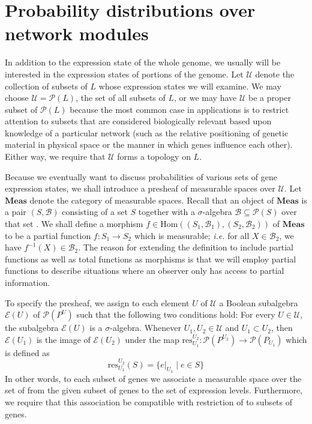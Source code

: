 \section{Probability distributions over network modules}

In addition to the expression state of the whole genome, we usually will be interested in the expression states of portions of the genome.  Let $\mathcal{U}$ denote the collection of subsets of $L$ whose expression states we will examine.  We may choose $\mathcal{U} = \mathcal{P}(L)$, the set of all subsets of $L$, or we may have $\mathcal{U}$ be a proper subset of $\mathcal{P}(L)$ because the most common case in applications is to restrict attention to subsets that are considered biologically relevant based upon knowledge of a particular network (such as the relative positioning of genetic material in physical space or the manner in which genes influence each other).  Either way, we require that $\mathcal{U}$ forms a topology on $L$.

Because we eventually want to discuss probabilities of various sets of gene expression states, we shall introduce a presheaf of measurable spaces over $\mathcal{U}$.  Let $\mathbf{Meas}$ denote the category of measurable spaces. Recall that an object of $\mathbf{Meas}$ is a pair $(S,\mathcal{B})$ consisting of a set $S$ together with a $\sigma$-algebra $\mathcal{B} \subseteq \mathcal{P}(S)$ over that set \cite{Ash1999}.  We shall define a morphism $f \in \mathrm{Hom}((S_1,\mathcal{B}_1), (S_2,\mathcal{B}_2))$ of $\mathbf{Meas}$ to be a partial function $f \colon S_1 \to S_2$ which is measurable; \emph{i.e.} for all $X \in \mathcal{B}_2$, we have $f^{-1} (X) \in \mathcal{B}_2$.  The reason for extending the definition to include partial functions as well as total functions as morphisms is that we will employ partial functions to describe situations where an observer only has access to partial information.

To specify the presheaf, we assign to each element $U$ of $\mathcal{U}$ a Boolean subalgebra $\mathcal{E}(U)$ of $\mathcal{P}({P^U})$ such that the following two conditions hold:  For every $U \in \mathcal{U}$, the subalgebra $\mathcal{E}(U)$ is a $\sigma$-algebra.  Whenever $U_1, U_2 \in \mathcal{U}$ and $U_1 \subset U_2$, then $\mathcal{E}(U_1)$ is the image of $\mathcal{E}(U_2)$ under the map $\mathrm{res}^{U_2}_{U_1} \colon \mathcal{P}(P^{U_2}) \to \mathcal{P}(P_{U_1})$ which is defined as
\[
 \mathrm{res}^{U_2}_{U_1} (S) =
 \{ e|_{U_1} \mid e \in S\}
\]
In other words, to each subset of genes we associate a measurable space over the set of \gnpm{} from the given subset of genes to the set of expression levels.  Furthermore, we require that this association be compatible with restriction of \gnpm{} to subsets of genes.

